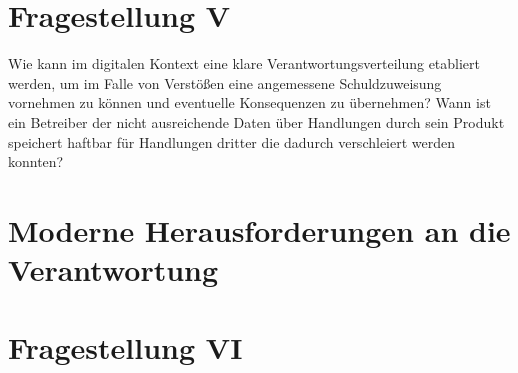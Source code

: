 \documentclass[journal]{IEEEtran}
\begin{document}
\begin{onecolumn}
\section*{Fragestellung V}

Wie kann im digitalen Kontext eine klare Verantwortungsverteilung etabliert werden, um im Falle von Verstößen
eine angemessene Schuldzuweisung vornehmen zu können und eventuelle Konsequenzen zu übernehmen? Wann ist ein
Betreiber der nicht ausreichende Daten über Handlungen durch sein Produkt speichert haftbar für Handlungen dritter
die dadurch verschleiert werden konnten?  

\section{Moderne Herausforderungen an die Verantwortung}

\section*{Fragestellung VI}

\end{onecolumn}
\end{document}
